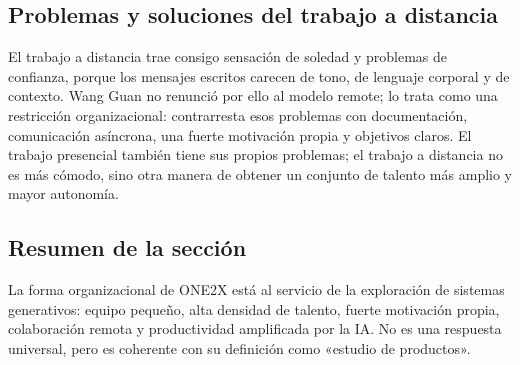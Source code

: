 \subsection{Problemas y soluciones del trabajo a distancia}

El trabajo a distancia trae consigo sensación de soledad y problemas de confianza, porque los mensajes escritos carecen de tono, de lenguaje corporal y de contexto. Wang Guan no renunció por ello al modelo remote; lo trata como una restricción organizacional: contrarresta esos problemas con documentación, comunicación asíncrona, una fuerte motivación propia y objetivos claros. El trabajo presencial también tiene sus propios problemas; el trabajo a distancia no es más cómodo, sino otra manera de obtener un conjunto de talento más amplio y mayor autonomía.

\subsection{Resumen de la sección}

La forma organizacional de ONE2X está al servicio de la exploración de sistemas generativos: equipo pequeño, alta densidad de talento, fuerte motivación propia, colaboración remota y productividad amplificada por la IA. No es una respuesta universal, pero es coherente con su definición como «estudio de productos».
